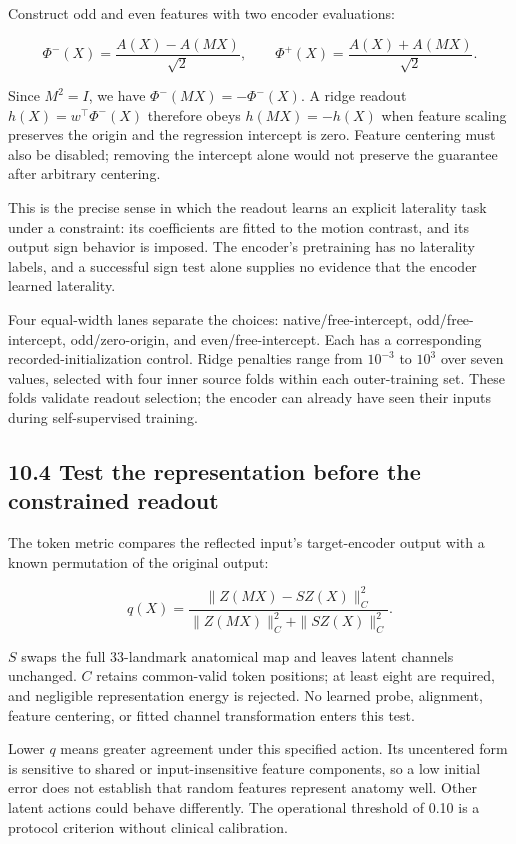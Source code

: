 \documentclass[11pt,letterpaper]{article}
\begin{document}
Construct odd and even features with two encoder evaluations:

\[
\Phi^-(X)=\frac{A(X)-A(MX)}{\sqrt{2}},
\qquad
\Phi^+(X)=\frac{A(X)+A(MX)}{\sqrt{2}}.
\]

Since \(M^2=I\), we have \(\Phi^-(MX)=-\Phi^-(X)\). A ridge readout
\(h(X)=w^\top\Phi^-(X)\) therefore obeys \(h(MX)=-h(X)\) when feature
scaling preserves the origin and the regression intercept is zero.
Feature centering must also be disabled; removing the intercept alone
would not preserve the guarantee after arbitrary centering.

This is the precise sense in which the readout learns an explicit
laterality task under a constraint: its coefficients are fitted to the
motion contrast, and its output sign behavior is imposed. The encoder's
pretraining has no laterality labels, and a successful sign test alone
supplies no evidence that the encoder learned laterality.

Four equal-width lanes separate the choices: native/free-intercept,
odd/free-intercept, odd/zero-origin, and even/free-intercept. Each has a
corresponding recorded-initialization control. Ridge penalties range
from \(10^{-3}\) to \(10^3\) over seven values, selected with four inner
source folds within each outer-training set. These folds validate
readout selection; the encoder can already have seen their inputs during
self-supervised training.

\subsection{10.4 Test the representation before the constrained
readout}\label{test-the-representation-before-the-constrained-readout}

The token metric compares the reflected input's target-encoder output
with a known permutation of the original output:

\[
q(X)=\frac{\|Z(MX)-SZ(X)\|_C^2}
{\|Z(MX)\|_C^2+\|SZ(X)\|_C^2}.
\]

\(S\) swaps the full 33-landmark anatomical map and leaves latent
channels unchanged. \(C\) retains common-valid token positions; at least
eight are required, and negligible representation energy is rejected. No
learned probe, alignment, feature centering, or fitted channel
transformation enters this test.

Lower \(q\) means greater agreement under this specified action. Its
uncentered form is sensitive to shared or input-insensitive feature
components, so a low initial error does not establish that random
features represent anatomy well. Other latent actions could behave
differently. The operational threshold of 0.10 is a protocol criterion
without clinical calibration.
\end{document}
